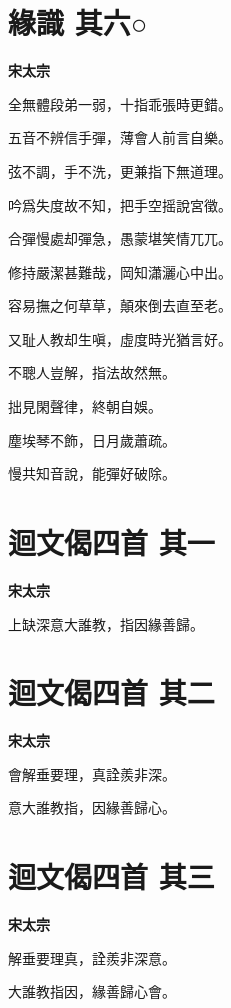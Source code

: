 \documentclass[12pt,a4paper]{ctexbook}
\begin{document}
\section{緣識  其六○}
\textbf{宋太宗}\par\vspace{0.5em}
全無體段弟一弱，十指乖張時更錯。\par
五音不辨信手彈，薄會人前言自樂。\par
弦不調，手不洗，更兼指下無道理。\par
吟爲失度故不知，把手空摇說宮徵。\par
合彈慢處却彈急，愚蒙堪笑情兀兀。\par
修持嚴潔甚難哉，岡知瀟灑心中出。\par
容易撫之何草草，顛來倒去直至老。\par
又耻人教却生嗔，虛度時光猶言好。\par
不聰人豈解，指法故然無。\par
拙見閑聲律，終朝自娛。\par
塵埃琴不飾，日月歲蕭疏。\par
慢共知音說，能彈好破除。\par

\section{迴文偈四首  其一}
\textbf{宋太宗}\par\vspace{0.5em}
上缺深意大誰教，指因緣善歸。\par

\section{迴文偈四首  其二}
\textbf{宋太宗}\par\vspace{0.5em}
會解垂要理，真詮羨非深。\par
意大誰教指，因緣善歸心。\par

\section{迴文偈四首  其三}
\textbf{宋太宗}\par\vspace{0.5em}
解垂要理真，詮羨非深意。\par
大誰教指因，緣善歸心會。\par
\end{document}
